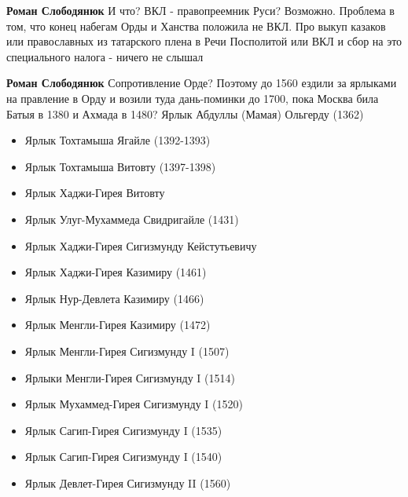 \begin{itemize}
\begin{itemize}
 
\textbf{Роман Слободянюк} И что? ВКЛ - правопреемник Руси? Возможно. Проблема в том, что конец набегам Орды и Ханства положила не ВКЛ. Про выкуп казаков или православных из татарского плена в Речи Посполитой или ВКЛ и сбор на это специального налога - ничего не слышал

 
\textbf{Роман Слободянюк} Сопротивление Орде? Поэтому до 1560 ездили за ярлыками на правление в Орду и возили туда дань-поминки до 1700, пока Москва била Батыя в 1380 и Ахмада в 1480? Ярлык Абдуллы (Мамая) Ольгерду (1362)


\begin{itemize}
  \item Ярлык Тохтамыша Ягайле (1392-1393)
  \item Ярлык Тохтамыша Витовту (1397-1398)
  \item Ярлык Хаджи-Гирея Витовту
  \item Ярлык Улуг-Мухаммеда Свидригайле (1431)
  \item Ярлык Хаджи-Гирея Сигизмунду Кейстутьевичу
  \item Ярлык Хаджи-Гирея Казимиру (1461)
  \item Ярлык Нур-Девлета Казимиру (1466)
  \item Ярлык Менгли-Гирея Казимиру (1472)
  \item Ярлык Менгли-Гирея Сигизмунду I (1507)
  \item Ярлыки Менгли-Гирея Сигизмунду I (1514)
  \item Ярлык Мухаммед-Гирея Сигизмунду I (1520)
  \item Ярлык Сагип-Гирея Сигизмунду I (1535)
  \item Ярлык Сагип-Гирея Сигизмунду I (1540)
  \item Ярлык Девлет-Гирея Сигизмунду II (1560)
\end{itemize}

 

\end{itemize}
\end{itemize}
